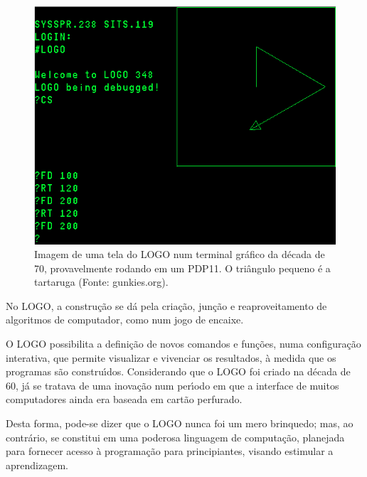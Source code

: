 \documentclass[
12pt,		%
openright,	%
twoside,  %
a4paper,			%
chapter=TITLE,		%
english,			%
french,				%
spanish,			%
brazil				%
]{USPSC-classe/USPSC}
\begin{document}
\begin{figure}[max size={\textwidth}{\textheight}]
\begin{minipage}[b]{0.4\linewidth}
                \includegraphics[width=1.0\linewidth]{../../imagens/logo-PDP11.png}
                \caption{Imagem de uma tela do LOGO num terminal gr\'afico da d\'ecada de 70, provavelmente rodando em um PDP11. O tri\^angulo pequeno \'e a tartaruga (Fonte: gunkies.org).}
                \label{ca83b217b58f57e503ff496c6c6f47bee5dc77cd}
\end{minipage}
\hspace{0.5cm}
\end{figure}



No LOGO, a constru\c{c}\~ao se d\'a pela cria\c{c}\~ao, jun\c{c}\~ao e reaproveitamento de algoritmos de computador, como num jogo de encaixe.









O LOGO possibilita a defini\c{c}\~ao de novos comandos e fun\c{c}\~oes, numa configura\c{c}\~ao interativa, que permite visualizar e vivenciar os resultados, \`a medida que os programas s\~ao constru\'{\i}dos. Considerando que o LOGO foi criado na d\'ecada de 60, j\'a se tratava de uma inova\c{c}\~ao num per\'{\i}odo em que a interface de muitos computadores ainda era baseada em cart\~ao perfurado.









Desta forma, pode-se dizer que o LOGO nunca foi um mero brinquedo; mas, ao contr\'ario, se constitui em uma poderosa linguagem de computa\c{c}\~ao, planejada para fornecer acesso \`a programa\c{c}\~ao para principiantes, visando estimular a aprendizagem.
\end{document}

